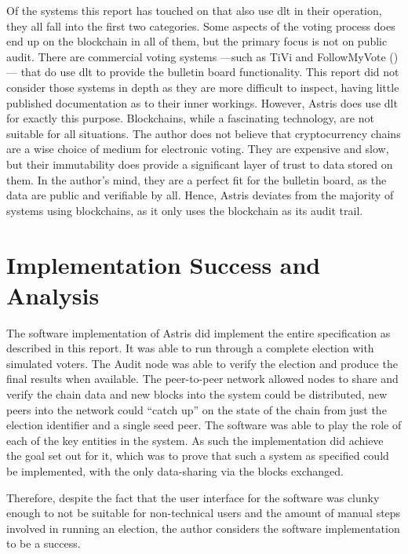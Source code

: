 Of the systems this report has touched on that also use \gls{dlt} in their operation, they all fall into the first two categories. Some aspects of the voting process does end up on the blockchain in all of them, but the primary focus is not on public audit. There are commercial voting systems ---such as TiVi \cite{smartmaticTIVIWhitepaper} and FollowMyVote ()--- that do use \gls{dlt} to provide the bulletin board functionality. This report did not consider those systems in depth as they are more difficult to inspect, having little published documentation as to their inner workings. However, Astris does use \gls{dlt} for exactly this purpose. Blockchains, while a fascinating technology, are not suitable for all situations. The author does not believe that cryptocurrency chains are a wise choice of medium for electronic voting. They are expensive and slow, but their immutability does provide a significant layer of trust to data stored on them. In the author's mind, they are a perfect fit for the bulletin board, as the data are public and verifiable by all. Hence, Astris deviates from the majority of systems using blockchains, as it only uses the blockchain as its audit trail.

\section{Implementation Success and Analysis}
\label{ch:analysis:impl}

The software implementation of Astris did implement the entire specification as described in this report. It was able to run through a complete election with simulated voters. The Audit node was able to verify the election and produce the final results when available. The peer-to-peer network allowed nodes to share and verify the chain data and new blocks into the system could be distributed, new peers into the network could ``catch up'' on the state of the chain from just the election identifier and a single seed peer. The software was able to play the role of each of the key entities in the system. As such the implementation did achieve the goal set out for it, which was to prove that such a system as specified could be implemented, with the only data-sharing via the blocks exchanged.

Therefore, despite the fact that the user interface for the software was clunky enough to not be suitable for non-technical users and the amount of manual steps involved in running an election, the author considers the software implementation to be a success.


